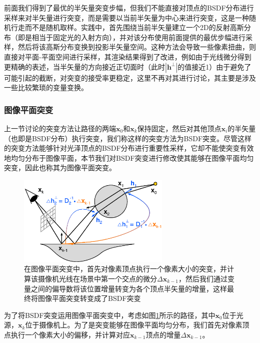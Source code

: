 前面我们得到了最优的半矢量突变步幅，但我们不能直接对顶点的BSDF分布进行采样来对半矢量进行突变，而是需要以当前半矢量为中心来进行突变，这是一种随机行走而不是随机取样。实践中，\cite{a:TheNaturalConstraintRepresentationofthePathSpaceforEfficientLightTransportSimulation}首先围绕当前半矢量建立一个2D的反射高斯分布（即是相当于固定光的入射方向），并对该分布使用前面提供的最优步幅进行采样，然后将该高斯分布变换到投影半矢量空间。这种方法会导致一些像素扭曲，\cite{a:ImprovedHalfVectorSpaceLightTransport}则直接对平面-平面空间进行采样，其渲染结果得到了改进，例如由于光线微分得到更精确的表述，当半矢量的方向接近正切面时（此时$|\mathbf{h}^{\perp}|$的值接近1）由于避免了可能引起的截断，对突变的接受率更稳定，这里不再对其进行讨论，其主要是涉及一些比较繁琐的变量变换。




\subsubsection{图像平面突变}
上一节讨论的突变方法让路径的两端$\mathbf{x}_0$和$\mathbf{x}_k$保持固定，然后对其他顶点$\mathbf{x}_i$的半矢量（也即是BSDF分布）执行突变，我们称这样的突变方法为BSDF突变。尽管这样的突变方法能够针对光泽顶点的BSDF分布进行重要性采样，它却不能使突变有效地均匀分布于图像平面，本节我们对BSDF突变进行修改使其能够在图像平面均匀突变，因此也称其为图像平面突变。

\begin{figure}
	\sidecaption
	\includegraphics[width=0.65\textwidth]{figures/mlt/hslt-perturbation}
	\caption{在图像平面突变中，首先对像素顶点执行一个像素大小的突变，并计算该摄像机光线在场景中第一个交点的微分$\Delta\mathbf{x}_{k-1}$，然后我们通过变量之间的偏导数将该位置增量转变为各个顶点半矢量的增量，这样最终将图像平面突变转变成了BSDF突变}
	\label{f:mlt-image-plane-perturbation}
\end{figure}

为了将BSDF突变运用图像平面突变中，考虑如图\ref{f:mlt-image-plane-perturbation}所示的路径，其中$\mathbf{x}_0$位于光源，$\mathbf{x}_k$位于摄像机上。为了是突变能够在图像平面均匀分布，我们首先对像素顶点执行一个像素大小的偏移，并计算对应$\mathbf{x}_{k-1}$顶点的增量$\Delta\mathbf{x}_{k-1}$。

